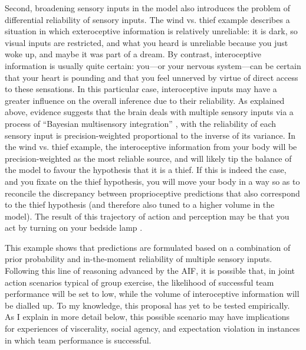 \begin{CJK}{UTF8}{gbsn}
Second, broadening sensory inputs in the model also introduces the problem of differential reliability of sensory inputs.  The wind vs. thief example describes a situation in which exteroceptive information is relatively unreliable: it is dark, so visual inputs are restricted, and what you heard is unreliable because you just woke up, and maybe it was part of a dream.  By contrast, interoceptive information is usually quite certain: you---or your nervous system---can be certain that your heart is pounding and that you feel unnerved by virtue of direct access to these sensations.  In this particular case, interoceptive inputs may have a greater influence on the overall inference due to their reliability.  As explained above, evidence suggests that the brain deals with multiple sensory inputs via a process of ``Bayesian multisensory integration'' \citep{Ernst2004}, with the reliability of each sensory input is precision-weighted proportional to the inverse of its variance.  In the wind vs. thief example, the interoceptive information from your body will be precision-weighted as the most reliable source, and will likely tip the balance of the model to favour the hypothesis that it is a thief.  If this is indeed the case, and you fixate on the thief hypothesis, you will move your body in a way so as to reconcile the discrepancy between proprioceptive predictions that also correspond to the thief hypothesis (and therefore also tuned to a higher volume in the model).  The result of this trajectory of action and perception may be that you act by turning on your bedside lamp \citep{Pezzulo2014}.

This example shows that predictions are formulated based on a combination of prior probability and in-the-moment reliability of multiple sensory inputs.  Following this line of reasoning advanced by the AIF, it is possible that, in joint action scenarios typical of group exercise, the likelihood of successful team performance will be set to low, while the volume of interoceptive information will be dialled up. To my knowledge, this proposal has yet to be tested empirically.  As I explain in more detail below, this possible scenario may have implications for experiences of viscerality, social agency, and expectation violation in instances in which team performance is successful.




\end{CJK}

